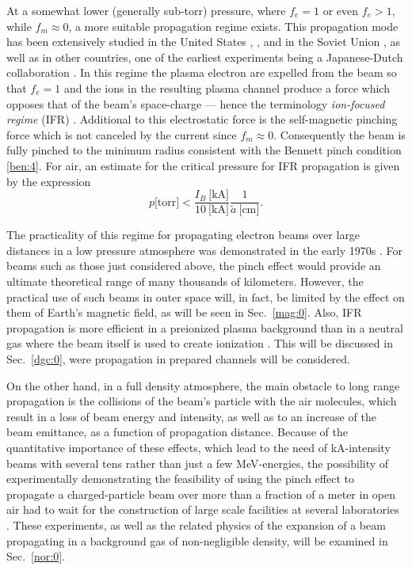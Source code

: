 \documentclass [12pt,a4paper,     ]{report} %
\begin{document}
  At a somewhat lower (generally sub-torr) pressure, where $f_e=1$ or even $f_e>1$, while $f_m\approx 0$, a more suitable propagation regime exists.  This propagation mode has been extensively studied in the United States \cite[p.10--11]{BEAL-1972-}, \cite{BRIGG1977-}, and in the Soviet Union \cite{DIDEN1976A, DIDEN1977-}, as well as in other countries, one of the earliest experiments being a Japanese-Dutch collaboration \cite{YAMAG1982-}.  In this regime the plasma electron are expelled from the beam so that $f_e=1$ and the ions in the resulting plasma channel produce a force which opposes that of the beam's space-charge --- hence the terminology \emph{ion-focused regime} (IFR) \cite{BRIGG1981-, BUCHA1987-, SWANE1993-}.  Additional to this electrostatic force is the self-magnetic pinching force which is not canceled by the current since $f_m\approx 0$.  Consequently the beam is fully pinched to the minimum radius consistent with the Bennett pinch condition \eqref{ben:4}.  For air, an estimate for the critical pressure for IFR propagation is given by the expression \cite{SMITH1985-}
%
\begin{equation}\label{ben:30} %
                  p\text{[torr]} < \frac{I_B~\text{[kA]}}{10~\text{[kA]}}
                                   \frac{1}{\tilde{a}~\text{[cm]}}.
\end{equation}
%

   The practicality of this regime for propagating electron beams over large distances in a low pressure atmosphere was demonstrated in the early 1970s \cite{BEAL-1972-, FLEIS1975-}.  For beams such as those just considered above, the pinch effect would provide an ultimate theoretical range of many thousands of kilometers.  However, the practical use of such beams in outer space will, in fact, be limited by the effect on them of Earth's magnetic field, as will be seen in Sec.~\ref{mag:0}.  Also, IFR propagation is more efficient in a preionized plasma background than in a neutral gas where the beam itself is used to create ionization \cite{SMITH1986-}.  This will be discussed in Sec.~\ref{dgc:0}, were propagation in prepared channels will be considered.

   On the other hand, in a full density atmosphere, the main obstacle to long range propagation is the collisions of the beam's particle with the air molecules, which result in a loss of beam energy and intensity, as well as to an increase of the beam emittance, as a function of propagation distance.  Because of the quantitative importance of these effects, which lead to the need of kA-intensity beams with several tens rather than just a few MeV-energies, the possibility of experimentally demonstrating the feasibility of using the pinch effect to propagate a charged-particle beam over more than a fraction of a meter in open air had to wait for the construction of large scale facilities at several laboratories \cite{MOIR-1981-,BARLE1981A}.  These experiments, as well as the related physics of the expansion of a beam propagating in a background gas of non-negligible density, will be examined in Sec.~\ref{nor:0}.
\end{document}
